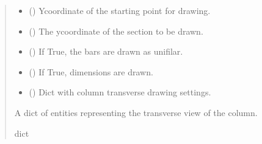 \documentclass[a4paper,10pt,english]{sphinxmanual}
\begin{document}
\begin{fulllineitems}
\begin{fulllineitems}
\begin{quote}
\begin{description}
\begin{itemize}
\item {} 
\sphinxAtStartPar
{} () \textendash{} Y\sphinxhyphen{}coordinate of the starting point for drawing.

\item {} 
\sphinxAtStartPar
{} (\sphinxstyleliteralemphasis{\sphinxupquote{, }}) \textendash{} The y\sphinxhyphen{}coordinate of the section to be drawn.

\item {} 
\sphinxAtStartPar
{} () \textendash{} If True, the bars are drawn as unifilar.

\item {} 
\sphinxAtStartPar
{} () \textendash{} If True, dimensions are drawn.

\item {} 
\sphinxAtStartPar
{} () \textendash{} Dict with column transverse drawing settings.

\end{itemize}

\sphinxAtStartPar
A dict of entities representing the transverse view of the column.

\sphinxAtStartPar
dict

\end{description}\end{quote}

\end{fulllineitems}



\end{fulllineitems}
\end{document}
